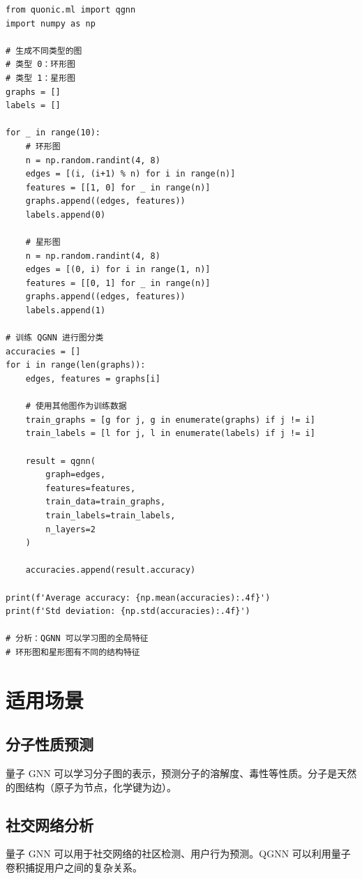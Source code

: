 \documentclass[12pt,a4paper]{article}
\begin{document}
\begin{verbatim}
from quonic.ml import qgnn
import numpy as np

# 生成不同类型的图
# 类型 0：环形图
# 类型 1：星形图
graphs = []
labels = []

for _ in range(10):
    # 环形图
    n = np.random.randint(4, 8)
    edges = [(i, (i+1) % n) for i in range(n)]
    features = [[1, 0] for _ in range(n)]
    graphs.append((edges, features))
    labels.append(0)

    # 星形图
    n = np.random.randint(4, 8)
    edges = [(0, i) for i in range(1, n)]
    features = [[0, 1] for _ in range(n)]
    graphs.append((edges, features))
    labels.append(1)

# 训练 QGNN 进行图分类
accuracies = []
for i in range(len(graphs)):
    edges, features = graphs[i]

    # 使用其他图作为训练数据
    train_graphs = [g for j, g in enumerate(graphs) if j != i]
    train_labels = [l for j, l in enumerate(labels) if j != i]

    result = qgnn(
        graph=edges,
        features=features,
        train_data=train_graphs,
        train_labels=train_labels,
        n_layers=2
    )

    accuracies.append(result.accuracy)

print(f'Average accuracy: {np.mean(accuracies):.4f}')
print(f'Std deviation: {np.std(accuracies):.4f}')

# 分析：QGNN 可以学习图的全局特征
# 环形图和星形图有不同的结构特征
\end{verbatim}

\section{适用场景}

\subsection{分子性质预测}

量子 GNN 可以学习分子图的表示，预测分子的溶解度、毒性等性质。分子是天然的图结构（原子为节点，化学键为边）。

\subsection{社交网络分析}

量子 GNN 可以用于社交网络的社区检测、用户行为预测。QGNN 可以利用量子卷积捕捉用户之间的复杂关系。
\end{document}

